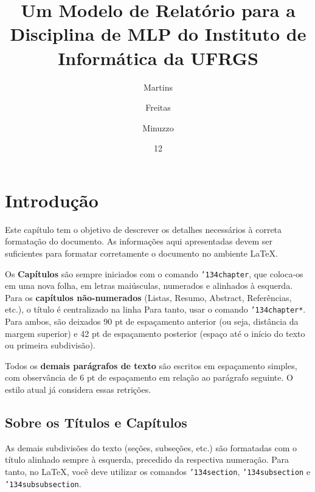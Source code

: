 \documentclass[rel_mlp]{iiufrgs}
\title{Um Modelo de Relatório para a Disciplina de MLP do Instituto de Informática da UFRGS}
\author{Martins}{Pedro} %
\author{Freitas}{Pietra} %
\author{Minuzzo}{Thayná} %
\date{12}{2017}
\begin{document}
\maketitle      


\tableofcontents








%
\chapter{Introdução} \label{intro}

Este capítulo tem o objetivo de descrever os detalhes necessários à correta formatação do documento. As informações aqui apresentadas devem ser suficientes para formatar corretamente o documento no ambiente \LaTeX.

Os \textbf{Capítulos} são sempre iniciados com o comando \texttt{\char'134chapter}, que coloca-os em uma nova folha, em letras maiúsculas, numerados e  alinhados à esquerda. Para os \textbf{capítulos não-numerados} (Listas, Resumo, Abstract, Referências, etc.), o título é centralizado na linha Para tanto, usar o comando \texttt{\char'134chapter*}. Para ambos, são deixados 90 pt de espaçamento anterior (ou seja, distância da margem superior) e 42 pt de espaçamento posterior (espaço até o início do texto ou primeira subdivisão). 

Todos os \textbf{demais parágrafos de texto} são escritos em espaçamento simples, com observância de 6 pt de espaçamento em relação ao parágrafo seguinte. O estilo atual já considera essas retrições. 


\section{Sobre os Títulos e Capítulos}

As demais subdivisões do texto (seções, subseções, etc.) são formatadas com o título alinhado sempre à esquerda, precedido da respectiva numeração. Para tanto, no \LaTeX, você deve utilizar os comandos \texttt{\char'134section},  \texttt{\char'134subsection} e  \texttt{\char'134subsubsection}.
\end{document}
